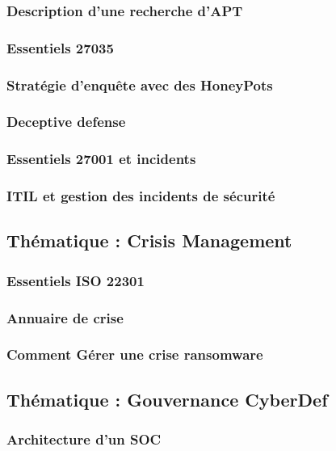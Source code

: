 \subsubsection{Description d'une recherche d'APT}
\subsubsection{Essentiels 27035}
\subsubsection{Stratégie d'enquête avec des HoneyPots}
\subsubsection{Deceptive defense}
\subsubsection{Essentiels 27001 et incidents}
\subsubsection{ITIL et gestion des incidents de sécurité}

\subsection{Thématique : Crisis Management}
\subsubsection{Essentiels ISO 22301}
\subsubsection{Annuaire de crise}
\subsubsection{Comment Gérer une crise ransomware }

\subsection{Thématique : Gouvernance CyberDef}
\subsubsection{Architecture d'un SOC}
